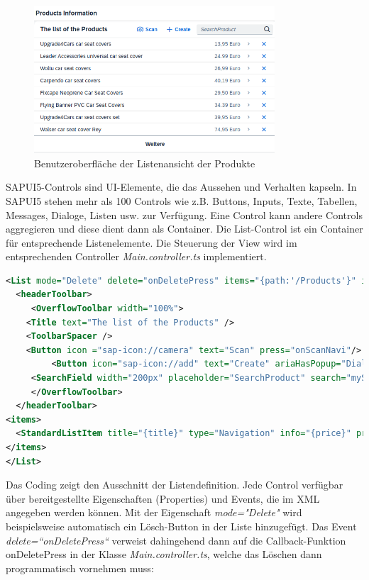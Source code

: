 \begin{figure}[htbp]
 \centering
 \includegraphics[width=0.8\textwidth]{Bilder/ui5 freestyle/3_20_Listeansicht.png}
 \caption{Benutzeroberfläche der Listenansicht der Produkte}
\end{figure}

SAPUI5-Controls sind UI-Elemente, die das Aussehen und Verhalten kapseln. In SAPUI5 stehen mehr als 100 Controls wie z.B. Buttons, Inputs, Texte, Tabellen, Messages, Dialoge, Listen usw. zur Verfügung. Eine Control kann andere Controls aggregieren und diese dient dann als Container. Die List-Control ist ein Container für entsprechende Listenelemente. Die Steuerung der View wird im entsprechenden Controller \textit{Main.controller.ts} implementiert. 

\begin{lstlisting}[language=XML,  caption=Auszüge aus der View \texttt{Main.view.xml}]
<List mode="Delete" delete="onDeletePress" items="{path:'/Products'}" id="productsList">
  <headerToolbar>
     <OverflowToolbar width="100%">
	<Title text="The list of the Products" />
	<ToolbarSpacer />
	<Button icon ="sap-icon://camera" text="Scan" press="onScanNavi"/>
         <Button icon="sap-icon://add" text="Create" ariaHasPopup="Dialog" press="pressAddInList" />
     <SearchField width="200px" placeholder="SearchProduct" search="mySearchProduct" />
     </OverflowToolbar>
  </headerToolbar>
<items>
  <StandardListItem title="{title}" type="Navigation" info="{price}" press="onItemPress"/>
</items>
</List>
\end{lstlisting}  

Das Coding zeigt den Ausschnitt der Listendefinition. Jede Control verfügbar über bereitgestellte Eigenschaften (Properties) und Events, die im XML angegeben werden können. Mit der Eigenschaft \textit{mode="Delete"} wird beispielsweise automatisch ein Lösch-Button in der Liste hinzugefügt. Das Event \textit{delete=“onDeletePress“} verweist dahingehend dann auf die Callback-Funktion onDeletePress in der Klasse \textit{Main.controller.ts}, welche das Löschen dann programmatisch vornehmen muss:

